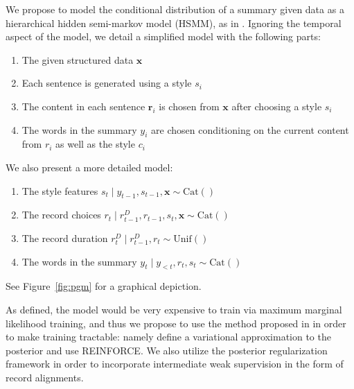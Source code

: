 \documentclass[11pt]{article}
\newcommand{\Cat}{\mathrm{Cat}}
\newcommand\Unif{\mathrm{Unif}}
\newcommand{\br}{\mathbf{r}}
\newcommand{\bx}{\mathbf{x}}
\begin{document}
We propose to model the conditional distribution of a summary given data as a 
hierarchical hidden semi-markov model (HSMM), as in \citep{liang2009semalign}.
Ignoring the temporal aspect of the model, we detail a simplified model
with the following parts:
\begin{enumerate}
\item The given structured data $\bx$ 
\item Each sentence is generated using a style $s_i$
\item The content in each sentence $\br_i$ is chosen from $\bx$
after choosing a style $s_i$
\item The words in the summary $y_i$ are chosen conditioning on
the current content from $r_i$ as well as the style $c_i$
\end{enumerate}
We also present a more detailed model:
\begin{enumerate}
\item The style features $s_t\mid y_{t-1},s_{t-1},\bx\sim\Cat()$
\item The record choices $r_t\mid r_{t-1}^D,r_{t-1},s_t,\bx\sim\Cat()$
\item The record duration $r_t^D\mid r_{t-1}^D,r_t\sim\Unif()$
\item The words in the summary $y_t\mid y_{<t},r_t,s_t\sim\Cat()$
\end{enumerate}
See Figure~\ref{fig:pgm} for a graphical depiction.

As defined, the model would be very expensive to train via maximum marginal likelihood
training, and thus we propose to use the method proposed in \citep{deng2018vattn}
in order to make training tractable: namely define a variational approximation to the
posterior and use REINFORCE.
We also utilize the posterior regularization framework in order to incorporate 
intermediate weak supervision in the form of record alignments.
\end{document}
